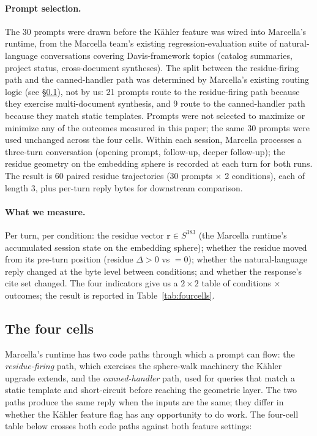 \documentclass[11pt,letterpaper]{article}
\begin{document}
\paragraph{Prompt selection.}
The 30 prompts were drawn before the K\"ahler feature was wired
into Marcella's runtime, from the Marcella team's existing
regression-evaluation suite of natural-language conversations
covering Davis-framework topics (catalog summaries, project status,
cross-document syntheses). The split between the residue-firing
path and the canned-handler path was determined by Marcella's
existing routing logic (see \S\ref{sec:fourcells}), not by us: 21
prompts route to the residue-firing path because they exercise
multi-document synthesis, and 9 route to the canned-handler path
because they match static templates. Prompts were not selected to
maximize or minimize any of the outcomes measured in this paper;
the same 30 prompts were used unchanged across the four cells.
Within each session, Marcella processes a three-turn conversation
(opening prompt, follow-up, deeper follow-up); the residue
geometry on the embedding sphere is recorded at each turn for both
runs. The result is 60 paired residue trajectories (30 prompts
$\times$ 2 conditions), each of length 3, plus per-turn
reply bytes for downstream comparison.

\paragraph{What we measure.}
Per turn, per condition: the residue vector
$\mathbf{r} \in S^{383}$ (the Marcella runtime's accumulated
session state on the embedding sphere); whether the residue moved
from its pre-turn position (residue $\Delta > 0$ vs $= 0$); whether
the natural-language reply changed at the byte level between
conditions; and whether the response's cite set changed. The four
indicators give us a $2 \times 2$ table of conditions
$\times$ outcomes; the result is reported in
Table~\ref{tab:fourcells}.

\subsection{The four cells}
\label{sec:fourcells}

Marcella's runtime has two code paths through which a prompt can
flow: the \emph{residue-firing} path, which exercises the
sphere-walk machinery the K\"ahler upgrade extends, and the
\emph{canned-handler} path, used for queries that match a static
template and short-circuit before reaching the geometric layer. The
two paths produce the same reply when the inputs are the same; they
differ in whether the K\"ahler feature flag has any opportunity to
do work. The four-cell table below crosses both code paths against
both feature settings:
\end{document}
